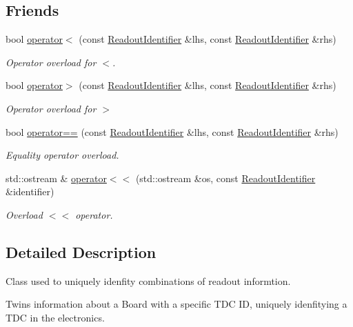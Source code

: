 \subsection*{Friends}
\begin{DoxyCompactItemize}
\item 
bool \hyperlink{class_readout_identifier_aa0d096b09bfc6a21f2c29ec777e101f8}{operator$<$} (const \hyperlink{class_readout_identifier}{Readout\+Identifier} \&lhs, const \hyperlink{class_readout_identifier}{Readout\+Identifier} \&rhs)
\begin{DoxyCompactList}\small\item\em Operator overload for $<$. \end{DoxyCompactList}\item 
bool \hyperlink{class_readout_identifier_a8738ea1dc34492f456b68bb02aec8966}{operator$>$} (const \hyperlink{class_readout_identifier}{Readout\+Identifier} \&lhs, const \hyperlink{class_readout_identifier}{Readout\+Identifier} \&rhs)
\begin{DoxyCompactList}\small\item\em Operator overload for $>$ \end{DoxyCompactList}\item 
bool \hyperlink{class_readout_identifier_a91bb6963f51c84fd2d8bcf104fc0b226}{operator==} (const \hyperlink{class_readout_identifier}{Readout\+Identifier} \&lhs, const \hyperlink{class_readout_identifier}{Readout\+Identifier} \&rhs)
\begin{DoxyCompactList}\small\item\em Equality operator overload. \end{DoxyCompactList}\item 
std\+::ostream \& \hyperlink{class_readout_identifier_a62474a342fbe3d79da5b8a869d95e72e}{operator$<$$<$} (std\+::ostream \&os, const \hyperlink{class_readout_identifier}{Readout\+Identifier} \&identifier)
\begin{DoxyCompactList}\small\item\em Overload $<$$<$ operator. \end{DoxyCompactList}\end{DoxyCompactItemize}


\subsection{Detailed Description}
Class used to uniquely idenfity combinations of readout informtion. 

Twins information about a Board with a specific T\+DC ID, uniquely idenfitying a T\+DC in the electronics.

